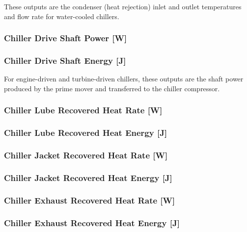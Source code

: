 These outputs are the condenser (heat rejection) inlet and outlet temperatures and flow rate for water-cooled chillers.

\subsubsection{Chiller Drive Shaft Power {[}W{]}}\label{chiller-drive-shaft-power-w}

\subsubsection{Chiller Drive Shaft Energy {[}J{]}}\label{chiller-drive-shaft-energy-j}

For engine-driven and turbine-driven chillers, these outputs are the shaft power produced by the prime mover and transferred to the chiller compressor.

\subsubsection{Chiller Lube Recovered Heat Rate {[}W{]}}\label{chiller-lube-recovered-heat-rate-w}

\subsubsection{Chiller Lube Recovered Heat Energy {[}J{]}}\label{chiller-lube-recovered-heat-energy-j}

\subsubsection{Chiller Jacket Recovered Heat Rate {[}W{]}}\label{chiller-jacket-recovered-heat-rate-w}

\subsubsection{Chiller Jacket Recovered Heat Energy {[}J{]}}\label{chiller-jacket-recovered-heat-energy-j}

\subsubsection{Chiller Exhaust Recovered Heat Rate {[}W{]}}\label{chiller-exhaust-recovered-heat-rate-w}

\subsubsection{Chiller Exhaust Recovered Heat Energy {[}J{]}}\label{chiller-exhaust-recovered-heat-energy-j}

